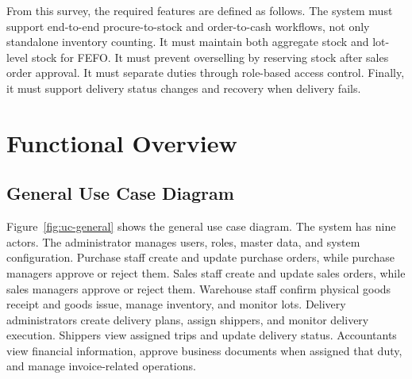 \begin{table}[H]\centering
\caption{Comparison of existing distribution-management products}
\label{tab:survey}
\end{table}

From this survey, the required features are defined as follows. The system must
support end-to-end procure-to-stock and order-to-cash workflows, not only
standalone inventory counting. It must maintain both aggregate stock and
lot-level stock for FEFO. It must prevent overselling by reserving stock after
sales order approval. It must separate duties through role-based access control.
Finally, it must support delivery status changes and recovery when delivery
fails.

\section{Functional Overview}

\subsection{General Use Case Diagram}
Figure~\ref{fig:uc-general} shows the general use case diagram. The system has
nine actors. The administrator manages users, roles, master data, and system
configuration. Purchase staff create and update purchase orders, while purchase
managers approve or reject them. Sales staff create and update sales orders,
while sales managers approve or reject them. Warehouse staff confirm physical
goods receipt and goods issue, manage inventory, and monitor lots. Delivery
administrators create delivery plans, assign shippers, and monitor delivery
execution. Shippers view assigned trips and update delivery status. Accountants
view financial information, approve business documents when assigned that duty,
and manage invoice-related operations.

